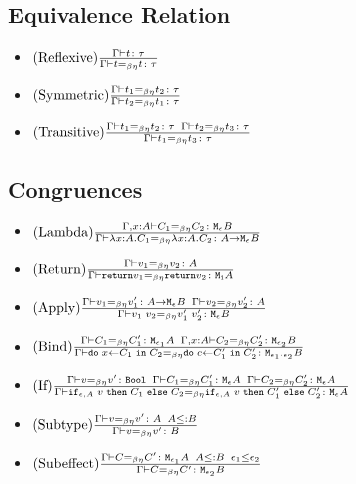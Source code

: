 {\begin{itemize}
    \end{itemize}
    \subsection{Equivalence Relation}
    \begin{itemize}
        \item $\treerule{Reflexive}{\gtyperelation{t}{\tau}}{\gberelation{t}{t}{\tau}}$
        \item $\treerule{Symmetric}{\gberelation{t_1}{t_2}{\tau}}{\gberelation{t_2}{t_1}{\tau}}$
        \item $\treerule{Transitive}{\gberelation{t_1}{t_2}{\tau}\s\s\gberelation{t_2}{t_3}{\tau}}{\gberelation{t_1}{t_3}{\tau}}$
    \end{itemize}
    \subsection{Congruences}
    \begin{itemize}
        \item $\treerule{Lambda}{\berelation{\gax}{C_1}{C_2}{\meb}}{\gberelation{\lam{x}{A}{C_1}}{\lam{x}{A}{C_2}}{\aeb}}$
        
        \item $\treerule{Return}{\gberelation{v_1}{v_2}{A}}{\gberelation{\return{v_1}}{\return{v_2}}{\moa}}$
        
        \item $\treerule{Apply}{\gberelation{v_1}{v_1'}{\aeb}\s\s\gberelation{v_2}{v_2'}{A}}{\gberelation{\apply{v_1}{v_2}}{\apply{v_1'}{v_2'}}{\meb}}$
        
        \item $\treerule{Bind}{\gberelation{C_1}{C_1'}{\M{\e_1}{A}} \s\s \berelation{\gax}{C_2}{C_2'}{\M{\e_2}{B}}}{\gberelation{\doin{x}{C_1}{C_2}}{\doin{c}{C_1'}{C_2'}}{\M{\e_1 \dot \e_2}{B}}}$
        
        \item $\treerule{If}{\gberelation{v}{v'}{\B} \s\s \gberelation{C_1}{C_1'}{\mea}\s\s\gberelation{C_2}{C_2'}{\mea}}{\gberelation{\ifthenelse{\e}{A}{v}{C_1}{C_2}}{\ifthenelse{\e}{A}{v}{C_1'}{C_2'}}{\mea}}$
        \item $\treerule{Subtype}{\gberelation{v}{v'}{A} \s\s A \subtype B}{\gberelation{v}{v'}{B}}$
        \item $\treerule{Subeffect}{\gberelation{C}{C'}{\M{\e_1}{A}}\s\s A \subtype B \s\s \e_1 \subeffect \e_2}{\gberelation{C}{C'}{\M{\e_2}{B}}}$
    \end{itemize}
}
